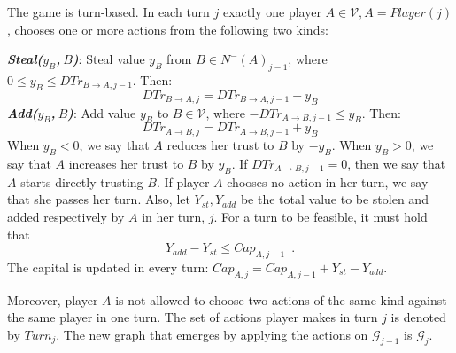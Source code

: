 \begin{definition}[Turns]
   The game is turn-based. In each turn $j$ exactly one player $A \in \mathcal{V}, A =
   Player\left(j\right)$, chooses one or more actions from the following two kinds:

   \noindent \textit{\textbf{Steal($y_B$,$\:B$)}}: Steal value $y_B$ from $B \in N^{-}\left(A\right)_{j-1}$, where
   $0 \leq y_B \leq DTr_{B \rightarrow A, j-1}$. Then:
   \begin{equation*}
      DTr_{B \rightarrow A, j} = DTr_{B \rightarrow A, j-1} - y_B
   \end{equation*}
   \noindent \textit{\textbf{Add($y_B$,$\:B$)}}:
   Add value $y_B$ to $B \in \mathcal{V}$, where $-DTr_{A \rightarrow B, j-1} \leq y_B$. Then:
   \begin{equation*}
      DTr_{A \rightarrow B, j} = DTr_{A \rightarrow B, j-1} + y_B
   \end{equation*}
   When $y_B < 0$, we say that $A$ reduces her trust to $B$ by $-y_B$. When $y_B > 0$, we say that $A$ increases her
   trust to $B$ by $y_B$. If $DTr_{A \rightarrow B, j-1} = 0$, then we say that $A$ starts directly trusting $B$.
   If player $A$ chooses no action in her turn, we say that she passes her turn. Also, let $Y_{st}, Y_{add}$ be the
   total value to be stolen and added respectively by $A$ in her turn, $j$. For a turn to be feasible, it must hold that
   \begin{equation}
      Y_{add} - Y_{st} \leq Cap_{A, j-1} \enspace.
   \end{equation}
   The capital is updated in every turn: $Cap_{A, j} = Cap_{A, j-1} + Y_{st} - Y_{add}$.

   Moreover, player $A$ is not allowed to choose two actions of the same kind against the same player in one turn.
   The set of actions player makes in turn $j$ is denoted by $Turn_j$. The new graph that emerges by applying
   the actions on $\mathcal{G}_{j-1}$ is $\mathcal{G}_j$.
\end{definition}
